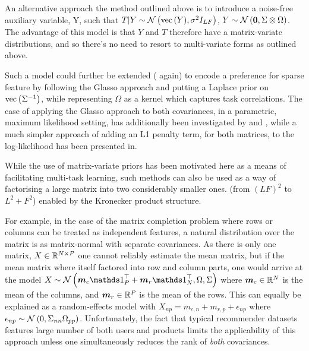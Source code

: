 

An alternative approach the method outlined above is to introduce a noise-free auxiliary variable, Y, such that $T|Y\sim\mathcal{N} \left( {\text{vec}\left(Y\right)}, {\sigma^2 I_{LF}} \right)$, $Y\sim\mathcal{N} \left( {\bm 0}, {\Sigma \otimes \Omega} \right)$\cite{Stegle2011}. The advantage of this model is that $Y$ and $T$ therefore have a matrix-variate distributions, and so there's no need to resort to multi-variate forms as outlined above. 

Such a model could further be extended (\cite{Stegle2011} again) to encode a preference for sparse feature by following the Glasso approach\cite{Friedman2008} and putting a Laplace prior on $\text{vec}\left({\Sigma}^{-1}\right)$, while representing $\Omega$ as a kernel which captures task correlations. The case of applying the Glasso approach to both covariances, in a parametric, maximum likelihood setting, has additionally been investigated by \cite{Tsiligkaridis2012b} and \cite{Tsiligkaridis2012}, while a much simpler approach of adding an L1 penalty term, for both matrices, to the log-likelihood has been presented in\cite{Zhang2010a}.


While the use of matrix-variate priors has been motivated here as a means of facilitating multi-task learning, such methods can also be used as a way of factorising a large matrix into two considerably smaller ones. (from $(LF)^2$ to $L^2 + F^2$) enabled by the Kronecker product structure.

For example, in the case of the matrix completion problem where rows or columns can be treated as independent features, a natural distribution over the matrix is as matrix-normal with separate covariances. As there is only one matrix, $X \in { \mathbb{R}^{N \times P} }$ one cannot reliably estimate the mean matrix, but if the mean matrix where itself factored into row and column parts, one would arrive at the model\cite{Allen2010}  $X \sim \mnor{\vv{m}_c \one_P\T + \vv{m}_r \one_N\T}{\Omega}{\Sigma}$ where $\bm m_c \in { \mathbb{R}^{N} }$ is the mean of the columns, and $\bm m_r \in { \mathbb{R}^{P} }$ is the mean of the rows. This can equally be explained as a random-effects model with $X_{np} = m_{c,n} + m_{r,p} + \epsilon_{np}$ where $\epsilon_{np} \sim \mathcal{N} \left( {0}, {\Sigma_{nn}\Omega_{pp}} \right)$. Unfortunately, the fact that typical recommender datasets features large number of both users and products limits the applicability of this approach unless one simultaneously reduces the rank of \emph{both} covariances.


